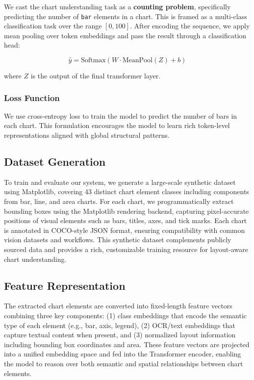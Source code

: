 \documentclass[11pt]{article}
\begin{document}
We cast the chart understanding task as a \textbf{counting problem}, specifically predicting the number of \texttt{bar} elements in a chart. This is framed as a multi-class classification task over the range $[0, 100]$. After encoding the sequence, we apply mean pooling over token embeddings and pass the result through a classification head:

\[
\hat{y} = \text{Softmax}(W \cdot \text{MeanPool}(Z) + b)
\]

where $Z$ is the output of the final transformer layer.

\subsubsection*{Loss Function}

We use cross-entropy loss to train the model to predict the number of bars in each chart. This formulation encourages the model to learn rich token-level representations aligned with global structural patterns.

\subsection*{Dataset Generation}

To train and evaluate our system, we generate a large-scale synthetic dataset using Matplotlib, covering 43 distinct chart element classes including components from bar, line, and area charts. For each chart, we programmatically extract bounding boxes using the Matplotlib rendering backend, capturing pixel-accurate positions of visual elements such as bars, titles, axes, and tick marks. Each chart is annotated in COCO-style JSON format, ensuring compatibility with common vision datasets and workflows. This synthetic dataset complements publicly sourced data and provides a rich, customizable training resource for layout-aware chart understanding.

\subsection*{Feature Representation}

The extracted chart elements are converted into fixed-length feature vectors combining three key components: (1) class embeddings that encode the semantic type of each element (e.g., bar, axis, legend), (2) OCR/text embeddings that capture textual content when present, and (3) normalized layout information including bounding box coordinates and area. These feature vectors are projected into a unified embedding space and fed into the Transformer encoder, enabling the model to reason over both semantic and spatial relationships between chart elements.
\end{document}

